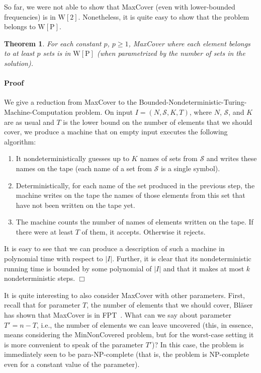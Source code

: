 \documentclass[11pt]{article}
\newtheorem{theorem}{Theorem}
\newenvironment{proof}{\paragraph{Proof}}{\hfill$\Box$\medskip}
\newcommand{\np}{{\mathrm{NP}}}
\newcommand{\wtwo}{{\mathrm{W[2]}}}
\newcommand{\wpclass}{{\mathrm{W[P]}}}
\newcommand{\calS}{{{\mathcal{S}}}}
\begin{document}
So far, we were not able to show that MaxCover (even with
lower-bounded frequencies) is in $\wtwo$. Nonetheless, it is quite
easy to show that the problem belongs to $\wpclass$.

\begin{theorem}
  For each constant $p$, $p \geq 1$, MaxCover where each element
  belongs to at least $p$ sets is in $\wpclass$ (when parametrized by
  the number of sets in the solution).
\end{theorem}
\begin{proof}
  We give a reduction from MaxCover to the
  Bounded-Nondeterministic-Turing-Machine-Computation problem. On
  input $I = (N,\calS,K,T)$, where $N$, $\calS$, and $K$ are as usual
  and $T$ is the lower bound on the number of elements that we should
  cover, we produce a machine that on empty input executes the following
  algorithm:
  \begin{enumerate}
  \item It nondeterministically guesses up to $K$ names of sets from
    $\calS$ and writes these names on the tape (each name of a set
    from $\calS$ is a single symbol).
  \item Deterministically, for each name of the set produced in the
    previous step, the machine writes on the tape the names of those
    elements from this set that have not been written on the tape yet.
  \item The machine counts the number of names of elements written on
    the tape.  If there were at least $T$ of them, it accepts. Otherwise
    it rejects.
  \end{enumerate}
  It is easy to see that we can produce a description of such a
  machine in polynomial time with respect to $|I|$. Further, it is
  clear that its nondeterministic running time is bounded by some
  polynomial of $|I|$ and that it makes at most $k$ nondeterministic
  steps.
\end{proof}



It is quite interesting to also consider MaxCover with other
parameters.  First, recall that for parameter $T$, the number of
elements that we should cover, Bl{\"a}ser has shown that MaxCover is
in FPT~\cite{bla:j:partial-set-cover}.  What can we say about
parameter $T' = n-T$, i.e., the number of elements we can leave
uncovered (this, in essence, means considering the MinNonCovered
problem, but for the worst-case setting it is more convenient to speak
of the parameter $T'$)? In this case, the problem is immediately seen
to be para-$\np$-complete (that is, the problem is $\np$-complete even
for a constant value of the parameter).
\end{document}
